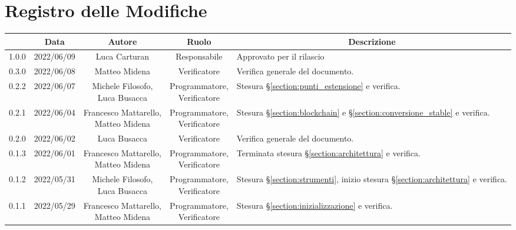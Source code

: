 \thispagestyle{empty}
\section*{Registro delle Modifiche}

\begin{center}
	\renewcommand{\arraystretch}{1.8}
	\begin{longtable}[c]{c | c | c | c | p{5cm}}
		\rowcolor[HTML]{125E28}
		\multicolumn{1}{c}{\color[HTML]{FFFFFF} \textbf{Versione}} & 
		\multicolumn{1}{c}{\color[HTML]{FFFFFF} \textbf{Data}} & 
		\multicolumn{1}{c}{\color[HTML]{FFFFFF} \textbf{Autore}} & 
		\multicolumn{1}{c}{\color[HTML]{FFFFFF} \textbf{Ruolo}} & 
		\multicolumn{1}{c}{\color[HTML]{FFFFFF} \textbf{Descrizione}} \\
		\endhead
		1.0.0 & 2022/06/09 & Luca Carturan & Responsabile & Approvato per il rilascio\\
		0.3.0 & 2022/06/08 & Matteo Midena & Verificatore & Verifica generale del documento.\\
		0.2.2 & 2022/06/07 & \Shortunderstack{Michele Filosofo, \\Luca Busacca} & \Shortunderstack{Programmatore,\\ Verificatore} & Stesura §\ref{section:punti_estensione} e verifica.\\
		0.2.1 & 2022/06/04 & \Shortunderstack{Francesco Mattarello, \\Matteo Midena} & \Shortunderstack{Programmatore, \\Verificatore} & Stesura §\ref{section:blockchain} e §\ref{section:conversione_stable} e verifica.\\
		0.2.0 & 2022/06/02 & Luca Busacca & Verificatore & Verifica generale del documento.\\
		0.1.3 & 2022/06/01 & \Shortunderstack{Francesco Mattarello, \\Matteo Midena} & \Shortunderstack{Programmatore,\\ Verificatore} & Terminata stesura §\ref{section:architettura} e verifica.\\
		0.1.2 & 2022/05/31 & \Shortunderstack {Michele Filosofo,\\ Luca Busacca} & \Shortunderstack{Programmatore, \\ Verificatore} & Stesura §\ref{section:strumenti}, inizio stesura §\ref{section:architettura} e verifica.\\
		0.1.1 & 2022/05/29 & \Shortunderstack{Francesco Mattarello, \\Matteo Midena} & \Shortunderstack{Programmatore, \\Verificatore} & Stesura §\ref{section:inizializzazione} e verifica.\\

\end{longtable}
\end{center}
